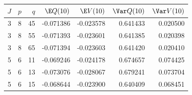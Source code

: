 \begin{tabular}{rrrrrrr}\toprule
$J$ & $p$ & $q$ & $\E Q(10)$ & $\E V(10)$ & $\Var Q(10)$ & $\Var V(10)$\\\midrule
3 & 8 & 45 & -0.071386 & -0.023578 & 0.641433 & 0.020500\\
3 & 8 & 55 & -0.071393 & -0.023601 & 0.641385 & 0.020398\\
3 & 8 & 65 & -0.071394 & -0.023603 & 0.641420 & 0.020410\\
5 & 6 & 11 & -0.069246 & -0.024178 & 0.674657 & 0.074425\\
5 & 6 & 13 & -0.073076 & -0.028067 & 0.679241 & 0.073704\\
5 & 6 & 15 & -0.068644 & -0.023900 & 0.640409 & 0.068451\\
\bottomrule\end{tabular}
